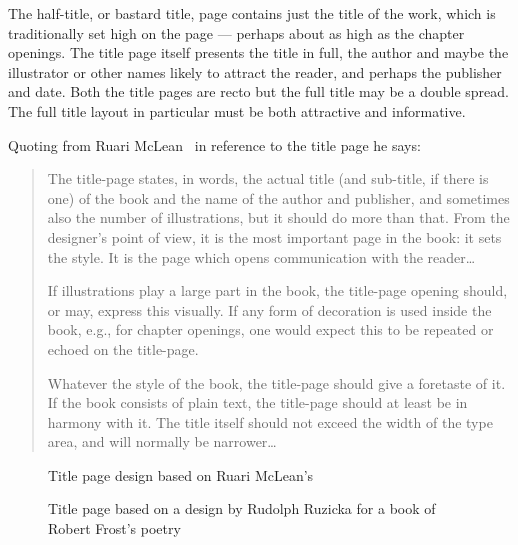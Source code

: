 \documentclass[10pt,letterpaper,extrafontsizes]{memoir}
\begin{document}
    The half-title, or bastard 
title, page contains just the 
title of the
work, which is traditionally set high on the page --- perhaps about as high
as the chapter openings. The title page 
itself presents the title in full, 
the author and maybe the illustrator or
other names likely to attract the reader, and perhaps the publisher and date.
Both the title pages are recto but the full title may be a double spread.
The full title layout in particular must be both attractive and informative.

    Quoting from Ruari McLean~\autocite[p. 148]{MCLEAN80} in reference to the 
title page he says:
\begin{quotation}
    The title-page states, in words, the actual title (and sub-title, if 
there is one) of the book and the name of the author and publisher, and
sometimes also the number of illustrations, but it should do more than that.
From the designer's point of view, it is the most important page in the
book: it sets the style. It is the page which opens communication with the
reader\ldots

    If illustrations play a large part in the book, the title-page opening 
should, or may, express this visually. If any form of decoration is used 
inside the book, e.g., for chapter openings, one would expect this to be
repeated or echoed on the title-page.

    Whatever the style of the book, the title-page should give a foretaste
of it. If the book consists of plain text, the title-page should at least 
be in harmony with it. The title itself should not exceed the width of the
type area, and will normally be narrower\ldots
\end{quotation}


\begin{figure}
\centering
\begin{showtitle}
\titleJT
\end{showtitle}
\caption{Title page design based on Ruari McLean's } \label{fig:titleJT}
\end{figure}

\begin{figure}
\centering
\begin{showtitle}
\titleRF
\end{showtitle}
\caption{Title page based on a design by Rudolph Ruzicka for a book of Robert Frost's poetry} \label{fig:titleRF}
\end{figure}
\end{document}
